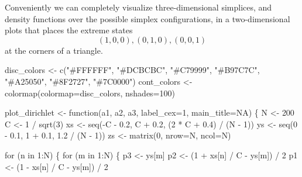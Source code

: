 \documentclass[
  letterpaper,
  DIV=11,
  numbers=noendperiod]{scrartcl}
\newenvironment{Shaded}{\begin{snugshade}}{\end{snugshade}}
\newcommand{\AttributeTok}[1]{\textcolor[rgb]{0.40,0.45,0.13}{#1}}
\newcommand{\ConstantTok}[1]{\textcolor[rgb]{0.56,0.35,0.01}{#1}}
\newcommand{\ControlFlowTok}[1]{\textcolor[rgb]{0.00,0.23,0.31}{#1}}
\newcommand{\DecValTok}[1]{\textcolor[rgb]{0.68,0.00,0.00}{#1}}
\newcommand{\FloatTok}[1]{\textcolor[rgb]{0.68,0.00,0.00}{#1}}
\newcommand{\FunctionTok}[1]{\textcolor[rgb]{0.28,0.35,0.67}{#1}}
\newcommand{\NormalTok}[1]{\textcolor[rgb]{0.00,0.23,0.31}{#1}}
\newcommand{\OtherTok}[1]{\textcolor[rgb]{0.00,0.23,0.31}{#1}}
\newcommand{\SpecialCharTok}[1]{\textcolor[rgb]{0.37,0.37,0.37}{#1}}
\newcommand{\StringTok}[1]{\textcolor[rgb]{0.13,0.47,0.30}{#1}}
\begin{document}
Conveniently we can completely visualize three-dimensional simplices,
and density functions over the possible simplex configurations, in a
two-dimensional plots that places the extreme states \[
(1, 0, 0), (0, 1, 0), (0, 0, 1)
\] at the corners of a triangle.

\begin{Shaded}
\begin{Highlighting}[]
\NormalTok{disc\_colors }\OtherTok{\textless{}{-}} \FunctionTok{c}\NormalTok{(}\StringTok{"\#FFFFFF"}\NormalTok{, }\StringTok{"\#DCBCBC"}\NormalTok{, }\StringTok{"\#C79999"}\NormalTok{, }\StringTok{"\#B97C7C"}\NormalTok{,}
                 \StringTok{"\#A25050"}\NormalTok{, }\StringTok{"\#8F2727"}\NormalTok{, }\StringTok{"\#7C0000"}\NormalTok{)}
\NormalTok{cont\_colors }\OtherTok{\textless{}{-}} \FunctionTok{colormap}\NormalTok{(}\AttributeTok{colormap=}\NormalTok{disc\_colors, }\AttributeTok{nshades=}\DecValTok{100}\NormalTok{)}

\NormalTok{plot\_dirichlet }\OtherTok{\textless{}{-}} \ControlFlowTok{function}\NormalTok{(a1, a2, a3, }\AttributeTok{label\_cex=}\DecValTok{1}\NormalTok{, }\AttributeTok{main\_title=}\ConstantTok{NA}\NormalTok{) \{}
\NormalTok{  N }\OtherTok{\textless{}{-}} \DecValTok{200}
\NormalTok{  C }\OtherTok{\textless{}{-}} \DecValTok{1} \SpecialCharTok{/} \FunctionTok{sqrt}\NormalTok{(}\DecValTok{3}\NormalTok{)}
\NormalTok{  xs }\OtherTok{\textless{}{-}} \FunctionTok{seq}\NormalTok{(}\SpecialCharTok{{-}}\NormalTok{C }\SpecialCharTok{{-}} \FloatTok{0.2}\NormalTok{, C }\SpecialCharTok{+} \FloatTok{0.2}\NormalTok{, (}\DecValTok{2} \SpecialCharTok{*}\NormalTok{ C }\SpecialCharTok{+} \FloatTok{0.4}\NormalTok{) }\SpecialCharTok{/}\NormalTok{ (N }\SpecialCharTok{{-}} \DecValTok{1}\NormalTok{))}
\NormalTok{  ys }\OtherTok{\textless{}{-}} \FunctionTok{seq}\NormalTok{(}\DecValTok{0} \SpecialCharTok{{-}} \FloatTok{0.1}\NormalTok{, }\DecValTok{1} \SpecialCharTok{+} \FloatTok{0.1}\NormalTok{, }\FloatTok{1.2} \SpecialCharTok{/}\NormalTok{ (N }\SpecialCharTok{{-}} \DecValTok{1}\NormalTok{))}
\NormalTok{  zs }\OtherTok{\textless{}{-}} \FunctionTok{matrix}\NormalTok{(}\DecValTok{0}\NormalTok{, }\AttributeTok{nrow=}\NormalTok{N, }\AttributeTok{ncol=}\NormalTok{N)}

  \ControlFlowTok{for}\NormalTok{ (n }\ControlFlowTok{in} \DecValTok{1}\SpecialCharTok{:}\NormalTok{N) \{}
    \ControlFlowTok{for}\NormalTok{ (m }\ControlFlowTok{in} \DecValTok{1}\SpecialCharTok{:}\NormalTok{N) \{}
\NormalTok{      p3 }\OtherTok{\textless{}{-}}\NormalTok{ ys[m]}
\NormalTok{      p2 }\OtherTok{\textless{}{-}}\NormalTok{ (}\DecValTok{1} \SpecialCharTok{+}\NormalTok{ xs[n] }\SpecialCharTok{/}\NormalTok{ C }\SpecialCharTok{{-}}\NormalTok{ ys[m]) }\SpecialCharTok{/} \DecValTok{2}
\NormalTok{      p1 }\OtherTok{\textless{}{-}}\NormalTok{ (}\DecValTok{1} \SpecialCharTok{{-}}\NormalTok{ xs[n] }\SpecialCharTok{/}\NormalTok{ C }\SpecialCharTok{{-}}\NormalTok{ ys[m]) }\SpecialCharTok{/} \DecValTok{2}
  

\end{Highlighting}
\end{Shaded}
\end{document}
